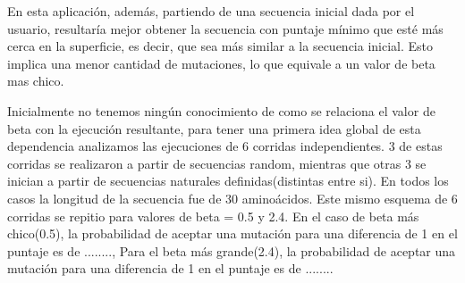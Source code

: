 En esta aplicación, además, partiendo de una secuencia inicial dada por el usuario, resultaría mejor obtener la secuencia con puntaje mínimo que esté más cerca en la superficie, es decir, que sea más similar a la secuencia inicial.
Esto implica una menor cantidad de mutaciones, lo que equivale a un valor de beta mas chico.




% 
% 
% 

Inicialmente no tenemos ningún conocimiento de como se relaciona el valor de beta con la ejecución resultante, para tener una primera idea global de esta dependencia analizamos las ejecuciones de 6 corridas independientes.
3 de estas corridas se realizaron a partir de secuencias random, mientras que otras 3 se inician a partir de secuencias naturales definidas(distintas entre si).
En todos los casos la longitud de la secuencia fue de 30 aminoácidos.
Este mismo esquema de 6 corridas se repitio para valores de beta = 0.5 y 2.4. 
En el caso de beta más chico(0.5), la probabilidad de aceptar una mutación para una diferencia de 1 en el puntaje es de ........, 
Para el beta más grande(2.4), la probabilidad de aceptar una mutación para una diferencia de 1 en el puntaje es de ........


